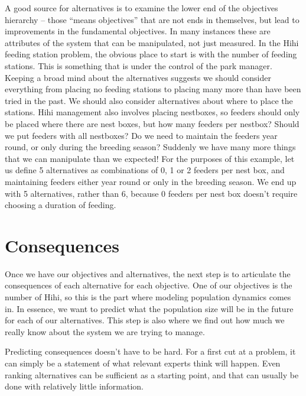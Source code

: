 \documentclass[]{book}
\begin{document}
A good source for alternatives is to examine the lower end of the
objectives hierarchy -- those ``means objectives'' that are not ends in
themselves, but lead to improvements in the fundamental objectives. In
many instances these are attributes of the system that can be
manipulated, not just measured. In the Hihi feeding station problem, the
obvious place to start is with the number of feeding stations. This is
something that is under the control of the park manager. Keeping a broad
mind about the alternatives suggests we should consider everything from
placing no feeding stations to placing many more than have been tried in
the past. We should also consider alternatives about where to place the
stations. Hihi management also involves placing nestboxes, so feeders
should only be placed where there are nest boxes, but how many feeders
per nestbox? Should we put feeders with all nestboxes? Do we need to
maintain the feeders year round, or only during the breeding season?
Suddenly we have many more things that we can manipulate than we
expected! For the purposes of this example, let us define 5 alternatives
as combinations of 0, 1 or 2 feeders per nest box, and maintaining
feeders either year round or only in the breeding season. We end up with
5 alternatives, rather than 6, because 0 feeders per nest box doesn't
require choosing a duration of feeding.

\section{Consequences}\label{consequences}

Once we have our objectives and alternatives, the next step is to
articulate the consequences of each alternative for each objective. One
of our objectives is the number of Hihi, so this is the part where
modeling population dynamics comes in. In essence, we want to predict
what the population size will be in the future for each of our
alternatives. This step is also where we find out how much we really
know about the system we are trying to manage.

Predicting consequences doesn't have to be hard. For a first cut at a
problem, it can simply be a statement of what relevant experts think
will happen. Even ranking alternatives can be sufficient as a starting
point, and that can usually be done with relatively little information.
\end{document}
